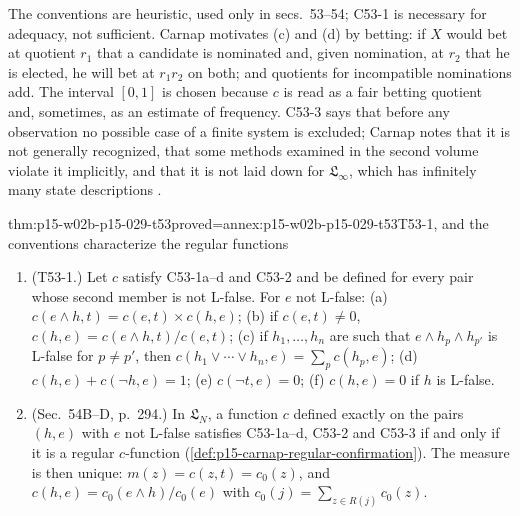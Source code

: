 The conventions are heuristic, used only in secs.~53--54; C53-1 is
necessary for adequacy, not sufficient. Carnap motivates (c) and (d)
by betting: if \(X\) would bet at quotient \(r_1\) that a candidate is
nominated and, given nomination, at \(r_2\) that he is elected, he will
bet at \(r_1r_2\) on both; and quotients for incompatible nominations
add. The interval \([0,1]\) is chosen because \(c\) is read as a fair
betting quotient and, sometimes, as an estimate of frequency. C53-3
says that before any observation no possible case of a finite system is
excluded; Carnap notes that it is not generally recognized, that some
methods examined in the second volume violate it implicitly, and that it
is not laid down for \(\mathfrak L_\infty\), which has infinitely many
state descriptions \cite[sec.~53, pp.~284--287]{Carnap1950Probability}.

\begin{hbtheorem}{thm:p15-w02b-p15-029-t53}{proved=annex:p15-w02b-p15-029-t53}{T53-1, and the conventions characterize the regular functions}
\begin{enumerate}
 \item (T53-1.) Let \(c\) satisfy C53-1a--d and C53-2 and be defined
       for every pair whose second member is not L-false. For \(e\) not
       L-false:
       (a) \(c(e\land h,t)=c(e,t)\times c(h,e)\);
       (b) if \(c(e,t)\ne0\), \(c(h,e)=c(e\land h,t)/c(e,t)\);
       (c) if \(h_1,\ldots,h_n\) are such that \(e\land h_p\land h_{p'}\)
       is L-false for \(p\ne p'\), then
       \(c(h_1\lor\cdots\lor h_n,e)=\sum_pc(h_p,e)\);
       (d) \(c(h,e)+c(\neg h,e)=1\);
       (e) \(c(\neg t,e)=0\);
       (f) \(c(h,e)=0\) if \(h\) is L-false.
 \item (Sec.~54B--D, p.~294.) In \(\mathfrak L_N\), a function \(c\)
       defined exactly on the pairs \((h,e)\) with \(e\) not L-false
       satisfies C53-1a--d, C53-2 and C53-3 if and only if it is a
       regular \(c\)-function
       (\cref{def:p15-carnap-regular-confirmation}). The measure is then
       unique: \(m(z)=c(z,t)=c_0(z)\), and \(c(h,e)=c_0(e\land h)/c_0(e)\)
       with \(c_0(j)=\sum_{z\in R(j)}c_0(z)\).
\end{enumerate}
\end{hbtheorem}

